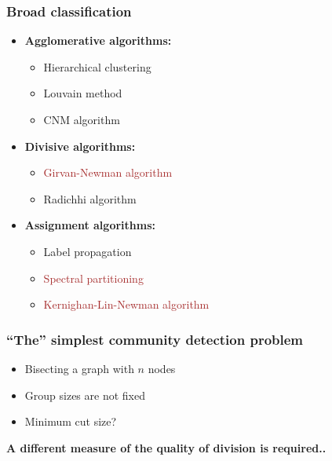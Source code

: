 \documentclass{beamer}
\begin{document}
\begin{frame}
    \frametitle{Broad classification}
    \centering
    \begin{itemize}
        \setlength\itemsep{0.5em}
        \item{{\bf Agglomerative algorithms:}
            
    \begin{itemize}
        \setlength\itemsep{0.5em}
        \item{Hierarchical clustering}
        \item{Louvain method}
        \item{CNM algorithm}
    \end{itemize}
            
            }
        \item{{\bf Divisive algorithms:}
            
    \begin{itemize}
        \setlength\itemsep{0.5em}
        \item{\textcolor{brown}{Girvan-Newman algorithm}}
        \item{Radichhi algorithm}
    \end{itemize}
            
            
            }
        \item{{\bf Assignment algorithms:}

    \begin{itemize}
        \setlength\itemsep{1em}
        \item{Label propagation}
        \item{\textcolor{brown}{Spectral partitioning}}
        \item{\textcolor{brown}{Kernighan-Lin-Newman algorithm}}
    \end{itemize}

            }
    \end{itemize}
\end{frame}
\begin{frame}
    \frametitle{``The'' simplest community detection problem}
    \centering
    \begin{itemize}
    \setlength\itemsep{1em}
        \item{Bisecting a graph with $n$ nodes}
        \item{Group sizes are not fixed}
        \item{Minimum cut size?}
    \end{itemize}

    \vspace{2em}
    \pause
    {\bf A different measure of the quality of division is required..}
\end{frame}
\end{document}
